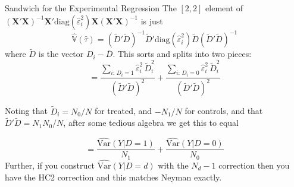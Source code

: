 \documentclass[xcolor=dvipsnames]{beamer}
\renewcommand{\epsilon}{\varepsilon}
\newcommand\V{\mathbb{V}}
\newcommand\X{{\bm X}}
\newcommand{\Var}{\mathrm{Var}}
\begin{document}
\begin{frame}{Sandwich for the Experimental Regression}
\small
{} The $[2,2]$ element of $(\X'\X)^{-1}\X' \text{diag}(\hat{\epsilon}_i^2) \X(\X'\X)^{-1}$ is just 
\[\widehat{\V}(\hat{\tau}) = (\tilde{D}'\tilde{D})^{-1}\tilde{D}' \text{diag}(\hat{\epsilon}_i^2) \tilde{D}(\tilde{D}'\tilde{D})^{-1}\]
where $\tilde{D}$ is the vector $D_i - \bar D$. This sorts and splits into two pieces:\\
\scriptsize
\[
= \frac{\displaystyle\sum_{i:\,D_i=1} \hat\epsilon_i^2\, \tilde D_i^2}{\left(\tilde D'\tilde D\right)^2} + \frac{\displaystyle\sum_{i:\,D_i=0} \hat\epsilon_i^2\, \tilde D_i^2}{\left(\tilde D'\tilde D\right)^2}
\]

 \footnotesize Noting that $\tilde D_i = N_0/N$ for treated, and $-N_1/N$ for controls, and that $\tilde D'\tilde D = N_1 N_0/N$, after some tedious algebra we get this to equal

\scriptsize
\[
= \frac{\widehat{\Var}(Y|D=1)}{N_1} + \frac{\widehat{\Var}(Y|D=0)}{N_0}
\]
 \footnotesize Further, if you construct $\widehat{\Var}(Y|D\!=\!d)$ with the $N_d-1$ correction then you have the HC2 correction and this matches Neyman exactly.

%
%
\end{frame}
\end{document}
